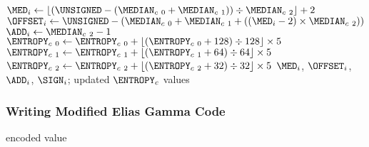 {{    $\text{\MED}_i \leftarrow \lfloor(\UNSIGNED - (\text{\MEDIAN}_{c~0} + \text{\MEDIAN}_{c~1})) \div \text{\MEDIAN}_{c~2}\rfloor + 2$\;
    $\text{\OFFSET}_i \leftarrow \text{\UNSIGNED} - (\text{\MEDIAN}_{c~0} + \text{\MEDIAN}_{c~1} + ((\text{\MED}_i - 2) \times \text{\MEDIAN}_{c~2}))$\;
    $\text{\ADD}_i \leftarrow \text{\MEDIAN}_{c~2} - 1$\;
    $\text{\ENTROPY}_{c~0} \leftarrow \text{\ENTROPY}_{c~0} + \lfloor(\text{\ENTROPY}_{c~0} + 128) \div 128\rfloor \times 5$\;
    $\text{\ENTROPY}_{c~1} \leftarrow \text{\ENTROPY}_{c~1} + \lfloor(\text{\ENTROPY}_{c~1} + 64) \div 64\rfloor \times 5$\;
    $\text{\ENTROPY}_{c~2} \leftarrow \text{\ENTROPY}_{c~2} + \lfloor(\text{\ENTROPY}_{c~2} + 32) \div 32\rfloor \times 5$\;
  }
  \Return $\text{\MED}_i$, $\text{\OFFSET}_i$, $\text{\ADD}_i$, $\text{\SIGN}_i$; updated $\text{\ENTROPY}_c$ values\;
  \EALGORITHM

  \subsubsection{Writing Modified Elias Gamma Code}
  \Return encoded value\;
  \EALGORITHM
}

\clearpage

